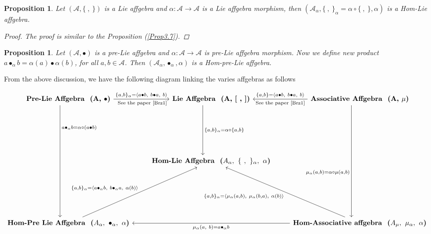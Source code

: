 \documentclass[14pt]{article}
\newtheorem{Prop}[thm]{Proposition}
\theoremstyle{Definition}
\theoremstyle{remark}
\begin{document}
\begin{Prop}
Let $(\mathcal{A},\{~,~\})$ is a Lie affgebra and $\alpha:\mathcal{A}\rightarrow \mathcal{A}$ is a Lie affgebra morphism, then $(\mathcal{A_{\alpha}},\{~,~\}_{\alpha}=\alpha\circ\{~,~\},\alpha)$ is a Hom-Lie affgebra.
\begin{proof}
The proof is similar to the Proposition (\ref{Prop3.7}).
\end{proof}
\end{Prop}
\begin{Prop}
Let $(\mathcal{A},\bullet)$ is a pre-Lie affgebra and $\alpha:\mathcal{A}\rightarrow\mathcal{A}$ is pre-Lie affgebra morphism. Now we define new product $a\bullet_{\alpha}b=\alpha(a)\bullet\alpha(b)$, for all $a,b\in \mathcal{A}$. Then $(\mathcal{A}_{\alpha},\bullet_{\alpha},\alpha)$ is a Hom-pre-Lie affgebra.
\end{Prop}
From the above discussion, we have the following diagram linking the varies affgebras as follows

\[\begin{tikzcd}
	{\textbf{Pre-Lie Affgebra~~(A, $\bullet$)}} & {\textbf{Lie Affgebra~~(A,~[~,~])}} & {\textbf{Associative Affgebra~~(A,~$\mu$)}} \\
	\\
	\\
	\\
	& {\textbf{Hom-Lie Affgebra~~($A_{\alpha},~\{~,~\}_{\alpha},~\alpha$)}} \\
	\\
	\\
	\\
	{\textbf{Hom-Pre Lie Affgebra~~($A_{\alpha},~ \bullet_{\alpha}, ~\alpha$)}} && {\textbf{Hom-Associative affgebra~~($A_{\mu},~\mu_{\alpha},~\alpha$)}}
	\arrow["{\{a,b\}_{\alpha}=\langle a\bullet b,~b\bullet a,~b \rangle}"above,"{\text{ See the paper \cite{Brz1}}}"below, from=1-1, to=1-2]
	\arrow["{{{a\bullet_{\alpha}b=\alpha\circ(a\bullet b)}}}"{pos=0.2}, shift right=5, from=1-1, to=9-1]
	\arrow["{{{\{a,b\}_{\alpha}=\alpha\circ\{a,b\}}}}", shift right=5, from=1-2, to=5-2]
	\arrow["{\{a,b\}=\langle a\bullet b,~b\bullet a,~b \rangle}"above,"{\text{See the paper \cite{Brz1}}}"below, from=1-3, to=1-2]
	\arrow["{{{\mu_{\alpha}(a,b)=\alpha\circ\mu(a,b)}}}"'{pos=0.6}, shift right=5, from=1-3, to=9-3]
	\arrow["{{{\{a,b\}_{\alpha}=\langle a\bullet_{\alpha}b,~b\bullet_{\alpha}a,~\alpha(b)\rangle}}}"{pos=0.5}, from=9-1, to=5-2]
	\arrow["{{{\{a,b\}_{\alpha}=\langle\mu_{\alpha}(a,b),~\mu_{\alpha}(b,a),~\alpha(b)\rangle}}}", from=9-3, to=5-2]
	\arrow["{{\mu_{\alpha}(a,~b)=a\bullet_{\alpha}b}}"below, from=9-3, to=9-1]
\end{tikzcd}\]
\end{document}
